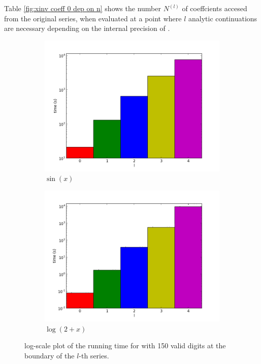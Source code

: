 		Table \ref{fig:xinv coeff 0 dep on n} shows the number $N^{(l)}$ of coeffcients accesed from the original series, when evaluated at a point where $l$ analytic continuations are necessary depending on 
		the internal precision of \irram.

		\begin{figure}[h]
			\centering
			\begin{subfigure}{.45\textwidth}
				\includegraphics[width=1.0\textwidth]{img/analytic/sin_for_n_prec_150_dep_on_series_log.png}
				\caption{$\sin(x)$}
			\end{subfigure}
			\begin{subfigure}{.45\textwidth}
				\includegraphics[width=1.0\textwidth]{img/analytic/log_for_n_prec_150_dep_on_series_log.png}
				\caption{$\log(2+x)$}
			\end{subfigure}
			\caption{log-scale plot of the running time for \anarect with 150 valid digits at the boundary of the $l$-th series.}
			\label{fig:baana dep on series}
		\end{figure}
    
